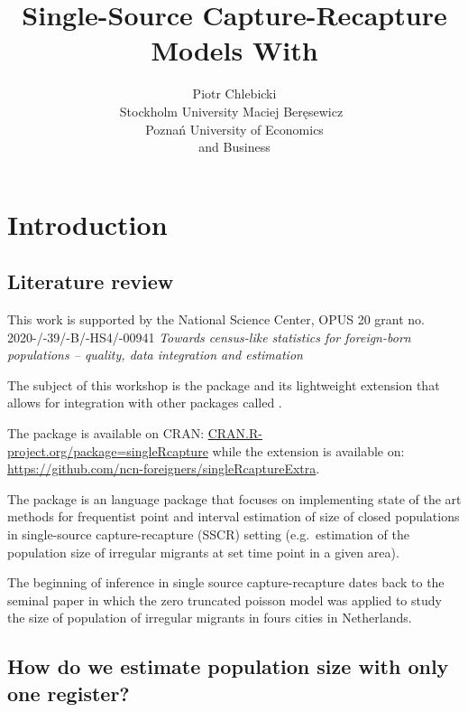 \documentclass[
]{jss}
\author{
Piotr Chlebicki\\Stockholm University \And Maciej
Beręsewicz~\orcidlink{0000-0002-8281-4301}\\Poznań University of
Economics\\
and Business
}
\title{Single-Source Capture-Recapture Models With \pkg{singleRcapture}}
\newcommand{\1}{\mathcal{I}} \newcommand{\bx}{\boldsymbol{x}}
\begin{document}
\hypertarget{introduction}{%
\section{Introduction}\label{introduction}}

\allowdisplaybreaks

\hypertarget{literature-review}{%
\subsection{Literature review}\label{literature-review}}

This work is supported by the National Science Center, OPUS 20 grant no.
2020-/-39/-B/-HS4/-00941
\textit{Towards census-like statistics for foreign-born populations -- quality, data integration and estimation}

The subject of this workshop is the  package and its
lightweight extension that allows for integration with other
 packages called .

The package is available on CRAN:
\url{CRAN.R-project.org/package=singleRcapture} while the extension is
available on:
\url{https://github.com/ncn-foreigners/singleRcaptureExtra}.

The  package is an  language package
that focuses on implementing state of the art methods for frequentist
point and interval estimation of size of closed populations in
single-source capture-recapture (SSCR) setting (e.g.~estimation of the
population size of irregular migrants at set time point in a given
area).

The beginning of inference in single source capture-recapture dates back
to the seminal \cite{ztpoisson} paper in which the zero truncated
poisson model was applied to study the size of population of irregular
migrants in fours cities in Netherlands.

\hypertarget{how-do-we-estimate-population-size-with-only-one-register}{%
\subsection{How do we estimate population size with only one
register?}\label{how-do-we-estimate-population-size-with-only-one-register}}
\end{document}
